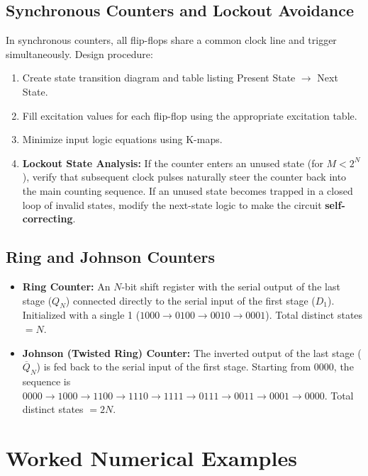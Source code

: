 \subsection{Synchronous Counters and Lockout Avoidance}
In synchronous counters, all flip-flops share a common clock line and trigger simultaneously.
Design procedure:
\begin{enumerate}
    \item Create state transition diagram and table listing Present State $\to$ Next State.
    \item Fill excitation values for each flip-flop using the appropriate excitation table.
    \item Minimize input logic equations using K-maps.
    \item \textbf{Lockout State Analysis:} If the counter enters an unused state (for $M < 2^N$), verify that subsequent clock pulses naturally steer the counter back into the main counting sequence. If an unused state becomes trapped in a closed loop of invalid states, modify the next-state logic to make the circuit \textbf{self-correcting}.
\end{enumerate}

\subsection{Ring and Johnson Counters}
\begin{itemize}
    \item \textbf{Ring Counter:} An $N$-bit shift register with the serial output of the last stage ($Q_N$) connected directly to the serial input of the first stage ($D_1$). Initialized with a single 1 ($1000 \to 0100 \to 0010 \to 0001$). Total distinct states $= N$.
    \item \textbf{Johnson (Twisted Ring) Counter:} The inverted output of the last stage ($\overline{Q}_N$) is fed back to the serial input of the first stage. Starting from $0000$, the sequence is $0000 \to 1000 \to 1100 \to 1110 \to 1111 \to 0111 \to 0011 \to 0001 \to 0000$. Total distinct states $= 2N$.
\end{itemize}

\section{Worked Numerical Examples}


